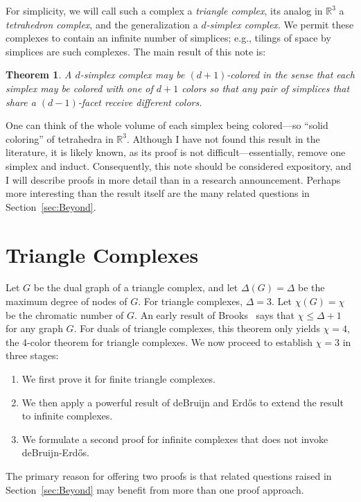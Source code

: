 \pdfoutput=1  \documentclass[]{article}
\newtheorem{theorem}{{\bf Theorem}}
\newcommand{\thmlab}[1]{\label{thm:#1}}
\newcommand{\seclab}[1]{\label{sec:#1}}
\newcommand{\secref}[1]{\ref{sec:#1}}
\def\R{{\mathbb{R}}}
\def\D{{\Delta}}
\def\c{{\chi}}
\begin{document}
For simplicity, we will call such a complex a \emph{triangle complex},
its analog in $\R^3$ a \emph{tetrahedron complex},
and the generalization a \emph{$d$-simplex complex}.
We permit these complexes to contain an infinite number of simplices;
e.g., tilings of space by simplices are such complexes.
The main result of this note is:
\begin{theorem}
A $d$-simplex complex may be $(d{+}1)$-colored in the sense that each
simplex may be colored with one of $d+1$ colors
so that any pair of simplices that share
a $(d{-}1)$-facet receive different colors.
\thmlab{main}
\end{theorem}
One can think of the whole volume of each simplex being colored---so
``solid coloring'' of tetrahedra in $\R^3$.
Although I have not found this result in the literature,
it is likely known, as its proof is not difficult---essentially,
remove one simplex and induct.
Consequently, this
note should be considered expository,
and I will describe proofs in more detail than in a research announcement.
Perhaps more interesting than the result itself 
are the many related questions in Section~\secref{Beyond}.

\section{Triangle Complexes}
\seclab{TriangleComplexes}
Let $G$ be the dual graph of a triangle complex, and
let $\D(G) = \D$ be the maximum degree of nodes of $G$.
For triangle complexes, $\D=3$.
Let $\c(G) = \c$ be the chromatic number of $G$.
An early result of Brooks~\cite{b-ocnn-41}
says that
$\c \le \D + 1$ for any graph $G$.
For duals of triangle complexes, this theorem only
yields $\c=4$, the 4-color theorem for triangle complexes.
We now proceed to establish $\c=3$ in three stages:
\begin{enumerate}
\item We first prove it for finite triangle complexes.
\item We then apply a powerful result of deBruijn and  Erd\H{o}s to
  extend
the result to infinite complexes.
\item We formulate a second proof for infinite complexes that does not
invoke deBruijn-Erd\H{o}s.
\end{enumerate}
The primary reason for offering two proofs is that related questions
raised
in Section~\secref{Beyond} may benefit from more than one proof
approach.
\end{document}
